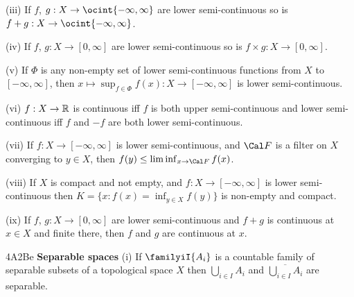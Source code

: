 \quad(iii) If $f$, $g:X\to\ocint{-\infty,\infty}$ are lower
semi-continuous so is $f+g:X\to\ocint{-\infty,\infty}$.

\quad(iv) If $f$, $g:X\to[0,\infty]$ are lower semi-continuous so
is $f\times g:X\to[0,\infty]$.

\quad(v) If $\Phi$ is any non-empty set of lower semi-continuous
functions from $X$ to $[-\infty,\infty]$, then
$x\mapsto\sup_{f\in\Phi}f(x):X\to[-\infty,\infty]$ is lower
semi-continuous.

\quad(vi) $f:X\to\Bbb R$ is continuous iff $f$ is both upper
semi-continuous and lower semi-continuous iff $f$ and $-f$ are both
lower semi-continuous.

\quad(vii)
If $f:X\to[-\infty,\infty]$ is lower semi-continuous, and
$\Cal F$ is a filter on $X$ converging to $y\in X$, then
$f(y)\le\liminf_{x\to\Cal F}f(x)$.

\quad(viii)
If $X$ is compact and not empty, and $f:X\to[-\infty,\infty]$ is lower
semi-continuous then $K=\{x:f(x)=\inf_{y\in X}f(y)\}$ is non-empty and
compact.

\quad(ix)
If $f$, $g:X\to[0,\infty]$ are lower semi-continuous and
$f+g$ is continuous at $x\in X$ and finite there,
then $f$ and $g$ are continuous at $x$.


\spheader 4A2Be {\bf Separable spaces} (i)
If $\familyiI{A_i}$ is a countable family of separable subsets of a
topological space $X$ then $\bigcup_{i\in I}A_i$
and $\overline{\bigcup_{i\in I}A_i}$ are separable.

